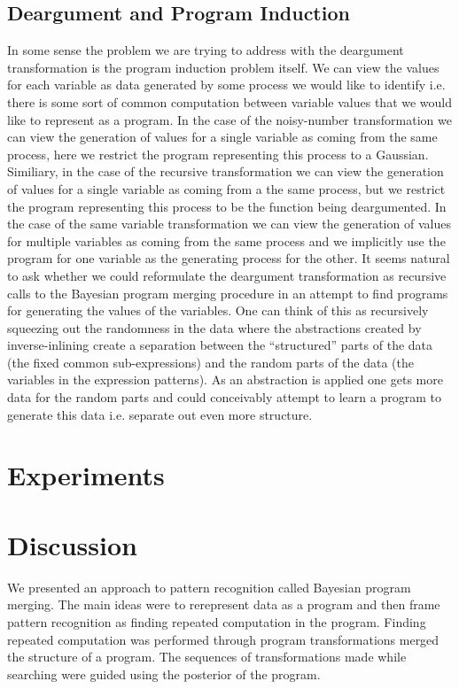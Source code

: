 \documentclass[a4paper,10pt]{article}
\begin{document}
\subsection{Deargument and Program Induction}
In some sense the problem we are trying to address with the deargument transformation is the program induction problem itself.  We can view the values for each variable as data generated by some process we would like to identify i.e. there is some sort of common computation between variable values that we would like to represent as a program.  In the case of the noisy-number transformation we can view the generation of values for a single variable as coming from the same process, here we restrict the program representing this process to a Gaussian.  Similiary, in the case of the recursive transformation we can view the generation of values for a single variable as coming from a the same process, but we restrict the program representing this process to be the function being deargumented.  In the case of the same variable transformation we can view the generation of values for multiple variables as coming from the same process and we implicitly use the program for one variable as the generating process for the other.  It seems natural to ask whether we could reformulate the deargument transformation as recursive calls to the Bayesian program merging procedure in an attempt to find programs for generating the values of the variables.  One can think of this as recursively squeezing out the randomness in the data where the abstractions created by inverse-inlining create a separation between the ``structured'' parts of the data (the fixed common sub-expressions) and the random parts of the data (the variables in the expression patterns).  As an abstraction is applied one gets more data for the random parts and could conceivably attempt to learn a program to generate this data i.e. separate out even more structure.
\section{Experiments}

\section{Discussion}

We presented an approach to pattern recognition called Bayesian program merging.  The main ideas were to rerepresent data as a program and then frame pattern recognition as finding repeated computation in the program.   Finding repeated computation was performed through program transformations merged the structure of a program.  The sequences of transformations made while searching were guided using the posterior of the program.  
\end{document}
